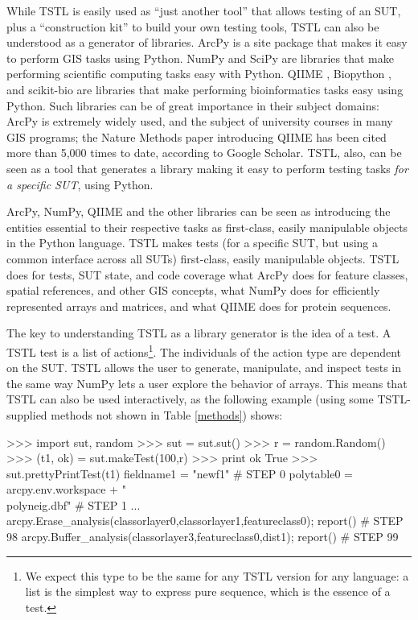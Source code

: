 While TSTL is easily used as ``just another tool'' that allows testing of an SUT, plus a ``construction kit'' to build your own testing tools, TSTL can also be understood as a generator of libraries.  ArcPy is a site package that makes it easy to perform GIS tasks using Python.  NumPy \cite{NumPy} and SciPy \cite{SciPy} are libraries that make performing scientific computing tasks easy with Python.  QIIME \cite{QIIME}, Biopython \cite{biopython}, and scikit-bio \cite{scikitbio} are libraries that make performing bioinformatics tasks easy using Python.  Such libraries can be of great importance in their subject domains:  ArcPy is extremely widely used, and the subject of university courses in many GIS programs; the Nature Methods paper introducing QIIME has been cited more than 5,000 times to date, according to Google Scholar.  TSTL, also, can be seen as a tool that generates a library making it easy to perform testing tasks \emph{for a specific SUT}, using Python. 

ArcPy, NumPy, QIIME and the other libraries can be seen as introducing the entities essential to their respective tasks as first-class, easily manipulable objects in the Python language.  TSTL makes tests (for a specific SUT, but using a common interface across all SUTs) first-class, easily manipulable objects.  TSTL does for tests, SUT state, and code coverage what ArcPy does for feature classes, spatial references, and other GIS concepts, what NumPy does for efficiently represented arrays and matrices, and what QIIME does for protein sequences.

The key to understanding TSTL as a library generator is the idea of a test.  A TSTL test is a list of actions\footnote{We expect this type to be the same for any TSTL version for any language:  a list is the simplest way to express pure sequence, which is the essence of a test.}.  The individuals of the action type are dependent on the SUT.  TSTL allows the user to generate, manipulate, and inspect tests in the same way NumPy lets a user explore the behavior of arrays.  This means that TSTL can also be used interactively, as the following example (using some TSTL-supplied methods not shown in Table \ref{methods}) shows:

{\scriptsize
\begin{code}
 >>> import sut, random
 >>> sut = sut.sut()
 >>> r = random.Random()
 >>> (t1, ok) = sut.makeTest(100,r)
 >>> print ok
 True
 >>> sut.prettyPrintTest(t1)
 fieldname1 = "newf1"                                                      \# STEP 0
 polytable0 = arcpy.env.workspace + "\\polyneig.dbf"                        \# STEP 1
...
 arcpy.Erase\_analysis(classorlayer0,classorlayer1,featureclass0); report() \# STEP 98
 arcpy.Buffer\_analysis(classorlayer3,featureclass0,dist1); report()        \# STEP 99
\end{code}
}

